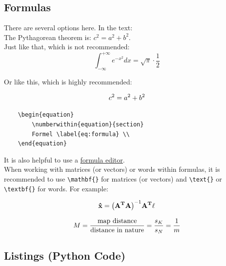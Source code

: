 \subsection{Formulas}

There are several options here. In the text:\\
The Pythagorean theorem is: $c^2 = a^2 + b^2$. \\
Just like that, which is not recommended: \\
\[\label{eq:GaussianErrorIntegral}
\int_{-\infty}^{+\infty} e^{-x^2} dx = \sqrt{\pi} \cdot \frac{1}{2}
\]

Or like this, which is highly recommended:

\begin{equation}
	\numberwithin{equation}{section}
	c^2 = a^2 + b^2 \label{eq:Pythagoras} \\
\end{equation}

\begin{verbatim}
    \begin{equation}
        \numberwithin{equation}{section}
        Formel \label{eq:formula} \\
    \end{equation}
\end{verbatim}

It is also helpful to use a \href{https://www.codecogs.com/latex/eqneditor.php}{formula editor}.\\

When working with matrices (or vectors) or words within formulas, it is recommended to use \verb|\mathbf{}| for matrices (or vectors) and \verb|\text{}| or \verb|\textbf{}| for words. For example:

\begin{equation}
	\numberwithin{equation}{section}
	\mathbf{\hat{x}} = \mathbf{\left(A^T A\right)}^{-1} \mathbf{A^T \ell} \label{eq:adjustment} \\
\end{equation}

\begin{equation}
	\numberwithin{equation}{section}
	M = \frac{\text{map distance}}{\text{distance in nature}} = \frac{s_K}{s_N} = \frac{1}{m} \label{eq:scale} \\
\end{equation}


\subsection{Listings (Python Code)}

